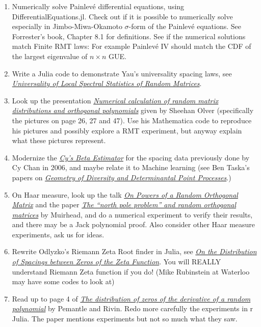 \documentclass{article}
\begin{document}
\begin{enumerate}
    
    \item Numerically solve Painlev{\'e} differential equations, using DifferentialEquations.jl. Check out if it is possible to numerically solve especially in Jimbo-Miwa-Okamoto $\sigma$-form of the Painlev{\'e} equations. See Forrester's book, Chapter 8.1 for definitions. See if the numerical solutions match Finite RMT laws: For example Painlev{\'e} IV should match the CDF of the largest eigenvalue of $n\times n$ GUE. 
    \item Write a Julia code to demonstrate Yau's universality spacing laws, see \href{http://www.ams.org/journals/bull/0000-000-00/S0273-0979-2012-01372-1/S0273-0979-2012-01372-1.pdf}{\emph{\color{blue}Universality of Local Spectral Statistics of Random Matrices}}.
    \item Look up the presentation \href{http://www.maths.usyd.edu.au/u/olver/talks/RandomMatrix.pdf}{\emph{\color{blue}Numerical calculation of random matrix distributions and orthogonal polynomials}} given by Sheehan Olver (specifically the pictures on page 26, 27 and 47). Use his Mathematica code to reproduce his pictures and possibly explore a RMT experiment, but anyway explain what these pictures represent.
    \item Modernize the \href{http://people.csail.mit.edu/cychan/BetaEstimator.html}{\emph{\color{blue}Cy's Beta Estimator}} for the spacing data previously done by Cy Chan in 2006, and maybe relate it to Machine learning (see Ben Taska's papers on \href{http://www.seas.upenn.edu/~taskar/}{\emph{\color{blue}Geometry of Diversity and Determinantal Point Processes}}.)
    \item On Haar measure, look up the talk \href{http://web.mit.edu/sea06/agenda/talks/Muirhead.pdf}{\emph{\color{blue}On Powers of a Random Orthogonal Matrix}} and the paper \href{http://arxiv.org/abs/0811.2678}{\emph{\color{blue}The ``north pole problem'' and random orthogonal matrices}} by Muirhead, and do a numerical experiment to verify their results, and there may be a Jack polynomial proof. Also consider other Haar measure experiments, ask us for ideas.
    \item Rewrite Odlyzko's Riemann Zeta Root finder in Julia, see \href{http://www.dtc.umn.edu/~odlyzko/doc/arch/zeta.zero.spacing.pdf}{\emph{\color{blue}On the Distribution of Spacings between Zeros of the Zeta Function}}. You will REALLY understand Riemann Zeta function if you do! (Mike Rubinstein at Waterloo may have some codes to look at)
    \item Read up to page 4 of \href{http://www.math.upenn.edu/~pemantle/papers/Preprints/zeros.pdf}{\emph{\color{blue}The distribution of zeros of the derivative of a random polynomial}} by Pemantle and Rivin. Redo more carefully the experiments in r Julia. The paper mentions experiments but not so much what they saw.

\end{enumerate}
\end{document}
